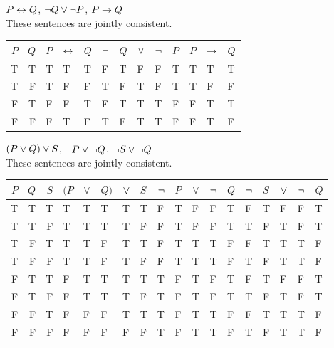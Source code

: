 \begin{small}
\begin{earg}
\item $P \leftrightarrow Q$, ${\neg} Q \vee {\neg} P$, $P \rightarrow Q$\\
These sentences are jointly consistent. 
\begin{flushleft}
\begin{tabular}{d d | f  e  h  | f e e e h | f e e}
$P$ & $Q$ & $P$ & $\leftrightarrow$ & $Q$ & ${\neg}$ & $Q$ & $\vee$ & ${\neg}$ & $P$ & $P$ & $\rightarrow$ & $Q$\\
\hline
T & T &    T & T &  T &     F & T & F & F & T &      T & T & T\Tstrut\\
T & F &    T & F &  F &     T & F & T & F & T &      T & F & F\\
F & T &    F & F &  T &     F & T & T & T & F &      F & T & T\\
F & F &    F & T &  F &     T & F & T & T & F &      F & T & F
\end{tabular}
\end{flushleft}\medskip

\item $(P \vee Q) \vee S$, ${\neg} P \vee {\neg} Q$, ${\neg} S \vee {\neg} Q$\\
These sentences are jointly consistent.
\begin{flushleft}
\begin{tabular}{d d d | f  e e e h | f e e e h | f e e e e}
$P$ & $Q$ & $S$ & $(P$ & $\vee$ & $Q)$ & $\vee$ & $S$ & ${\neg}$ & $P$ & $\vee$ & ${\neg}$ & $Q$ & ${\neg}$ & $S$ & $\vee$ & ${\neg}$ & $Q$\\
\hline
T & T & T &      T & T & T &   T & T &      F & T & F & F & T &      F & T & F & F & T\Tstrut\\
T & T & F &      T & T & T &   T & F &      F & T & F & F & T &      T & F & T & F & T\\
T & F & T &      T & T & F &   T & T &      F & T & T & T & F &      F & T & T & T & F\\   
T & F & F &      T & T & F &   T & F &      F  &T & T & T & F &      T & F & T & T & F\\\hline
F & T & T &      F & T & T &   T & T &      T & F & T & F & T &      F & T & F & F & T\Tstrut\\   
F & T & F &      F & T & T &   T & F &      T & F & T & F & T &      T & F & T & F & T\\   
F & F & T &      F & F & F &   T & T &      T  &F & T & T & F &      F & T & T & T & F\\   
F & F & F &      F & F & F &   F & F &     T & F & T & T & F &      T & F & T & T & F 
\end{tabular}
\end{flushleft}\medskip


\end{earg}
\end{small}
